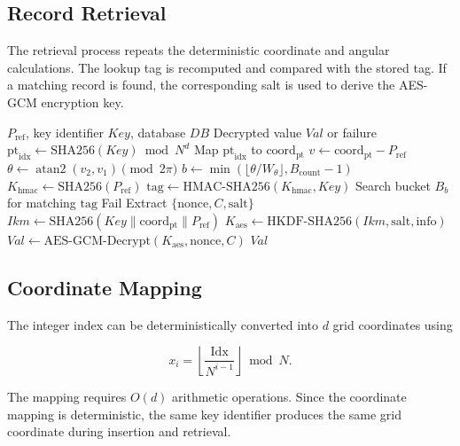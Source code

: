 \documentclass[journal,twocolumn]{IEEEtran}
\begin{document}
\subsection{Record Retrieval}

The retrieval process repeats the deterministic coordinate and angular calculations. The lookup tag is recomputed and compared with the stored tag. If a matching record is found, the corresponding salt is used to derive the AES-GCM encryption key.

\begin{algorithm}[htbp]
\caption{ABLKM Record Retrieval}
\label{alg:retrieve}
\begin{algorithmic}[1]
\REQUIRE $P_{\mathrm{ref}}$, key identifier $Key$, database $DB$
\ENSURE Decrypted value $Val$ or failure
\STATE $\mathrm{pt}_{\mathrm{idx}}\leftarrow\mathrm{SHA256}(Key)\bmod N^d$
\STATE Map $\mathrm{pt}_{\mathrm{idx}}$ to $\mathrm{coord}_{\mathrm{pt}}$
\STATE $v\leftarrow\mathrm{coord}_{\mathrm{pt}}-P_{\mathrm{ref}}$
\STATE $\theta\leftarrow\operatorname{atan2}(v_2,v_1)\pmod{2\pi}$
\STATE $b\leftarrow\min(\lfloor\theta/W_\theta\rfloor,B_{\mathrm{count}}-1)$
\STATE $K_{\mathrm{hmac}}\leftarrow\mathrm{SHA256}(P_{\mathrm{ref}})$
\STATE $\mathrm{tag}\leftarrow\mathrm{HMAC\text{-}SHA256}(K_{\mathrm{hmac}},Key)$
\STATE Search bucket $B_b$ for matching $\mathrm{tag}$
    \RETURN Fail
\ENDIF
\STATE Extract $\{\mathrm{nonce},C,\mathrm{salt}\}$
\STATE $Ikm\leftarrow\mathrm{SHA256}(Key\parallel\mathrm{coord}_{\mathrm{pt}}\parallel P_{\mathrm{ref}})$
\STATE $K_{\mathrm{aes}}\leftarrow\mathrm{HKDF\text{-}SHA256}(Ikm,\mathrm{salt},\mathrm{info})$
\STATE $Val\leftarrow\mathrm{AES\text{-}GCM\text{-}Decrypt}(K_{\mathrm{aes}},\mathrm{nonce},C)$
\RETURN $Val$
\end{algorithmic}
\end{algorithm}

\subsection{Coordinate Mapping}

The integer index can be deterministically converted into $d$ grid coordinates using

\begin{equation}
x_i=
\left\lfloor
\frac{\mathrm{Idx}}{N^{i-1}}
\right\rfloor
\bmod N.
\end{equation}

The mapping requires $O(d)$ arithmetic operations. Since the coordinate mapping is deterministic, the same key identifier produces the same grid coordinate during insertion and retrieval.
\end{document}
